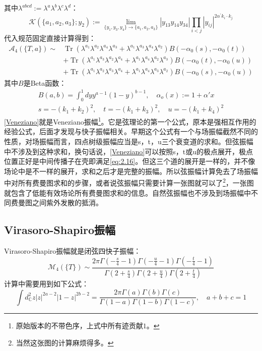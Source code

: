 其中$\lambda^{abcd}:=\lambda^a\lambda^b\lambda^c\lambda^d$：
\begin{equation}
	\label{eq:4.42}
	\mathcal{K}(\{a_1,a_2,a_3\};y_2):=\lim_{\{y_1,y_3,y_4\}\to\{a_1,a_2,a_3\}}|y_{13}y_{14}y_{34}|\prod_{i<j}|y_{ij}|^{2\alpha^{\prime}k_i\cdot k_j}
\end{equation}
代入规范固定直接计算得到：
\begin{equation}
	\label{Veneziano}
\begin{aligned}
		\mathcal{A}_4(\{T,a\}) \sim&
	\operatorname{Tr}\left(\lambda^{a_1}\lambda^{a_2}\lambda^{a_4}\lambda^{a_3}+\lambda^{a_1}\lambda^{a_3}\lambda^{a_4}\lambda^{a_2}\right)B(-\alpha_0(s),-\alpha_0(t))\\
	&+\operatorname{Tr}\left(\lambda^{a_1}\lambda^{a_3}\lambda^{a_2}\lambda^{a_4}+\lambda^{a_1}\lambda^{a_4}\lambda^{a_2}\lambda^{a_3}\right)B(-\alpha_0(t),-\alpha_0(u))\\
	&+\operatorname{Tr}\left(\lambda^{a_1}\lambda^{a_2}\lambda^{a_3}\lambda^{a_4}+\lambda^{a_1}\lambda^{a_4}\lambda^{a_3}\lambda^{a_2}\right)B(-\alpha_0(s),-\alpha_0(u))
\end{aligned}
\end{equation}
其中$B$是Beta函数：
\begin{equation}
\begin{gathered}
		B(a,b)=\int_0^1dyy^{a-1}(1-y)^{b-1},\quad \alpha_o(x):= 1+\alpha' x\\
	s=-(k_1+k_2)^2,\quad t=-(k_1+k_3)^2,\quad u=-(k_1+k_4)^2
\end{gathered}
\end{equation}
\ref{Veneziano}就是Veneziano振幅\footnote{原始版本的不带色序，上式中所有迹贡献$1$。}。它是弦理论的第一个公式，原本是强相互作用的经验公式，后面才发现与快子振幅相关\cite{limiao}。早期这个公式有一个与场振幅截然不同的性质，对场振幅而言，四点树级振幅应当是s，t，u三个衰变道的求和。但弦振幅中不涉及到这种求和，换句话说，\ref{Veneziano}可以按照s，t或u的极点展开，极点位置正好是中间传播子在壳即满足\ref{eq:2.16}。但这三个道的展开是一样的，并不像场论中是不一样的展开，求和之后才是完整的振幅。所以弦振幅计算免去了场振幅中对所有费曼图求和的步骤，或者说弦振幅只需要计算一张图就可以了\footnote{当然这张图的计算麻烦得多。}，一张图就包含了低能有效场论所有费曼图求和的信息。自然弦振幅也不涉及到场振幅中不同费曼图之间紫外发散的抵消。
\subsection{Virasoro-Shapiro振幅}
Virasoro-Shapiro振幅就是闭弦四快子振幅：
\begin{equation}
	\label{eq:4.45}
	\mathcal{M}_4(\{T\}) \sim \frac{2\pi\Gamma(-\frac{s}{4}-1)\Gamma(-\frac{u}{4}-1)\Gamma(-\frac{t}{4}-1)}{\Gamma(2+\frac{s}{4})\Gamma(2+\frac{u}{4})\Gamma(2+\frac{t}{4})}
\end{equation}
计算中需要用到如下公式：
\begin{equation}
	\int d^2_\mathbb{C}z|z|^{2a-2}|1-z|^{2b-2}=\frac{2\pi\Gamma(a)\Gamma(b)\Gamma(c)}{\Gamma(1-a)\Gamma(1-b)\Gamma(1-c)},\quad a+b+c=1
\end{equation}

